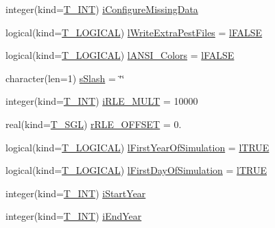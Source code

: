 \begin{DoxyCompactItemize}
\item 
integer(kind=\hyperlink{namespacetest_a6f91ebd89b58cfcc5da99faed9385c1e}{T\_\-INT}) \hyperlink{typetest_1_1_t___m_o_d_e_l___c_o_n_f_i_g_u_r_a_t_i_o_n_a2ba188b01d8c0f5653dc0f2c0a6d6722}{iConfigureMissingData}
\item 
logical(kind=\hyperlink{namespacetest_acdeac586276a7d1d394fb5eddc77fc3d}{T\_\-LOGICAL}) \hyperlink{typetest_1_1_t___m_o_d_e_l___c_o_n_f_i_g_u_r_a_t_i_o_n_a6b51e2f5c9172548b0d4ab207c83c366}{lWriteExtraPestFiles} = \hyperlink{namespacetest_ad44869e0204417021792170cd610ee25}{lFALSE}
\item 
logical(kind=\hyperlink{namespacetest_acdeac586276a7d1d394fb5eddc77fc3d}{T\_\-LOGICAL}) \hyperlink{typetest_1_1_t___m_o_d_e_l___c_o_n_f_i_g_u_r_a_t_i_o_n_a42c58ecbef54f15f365802f492c96925}{lANSI\_\-Colors} = \hyperlink{namespacetest_ad44869e0204417021792170cd610ee25}{lFALSE}
\item 
character(len=1) \hyperlink{typetest_1_1_t___m_o_d_e_l___c_o_n_f_i_g_u_r_a_t_i_o_n_a189e8cdf84807cb1cd85d11f7c542c34}{sSlash} = \char`\"{}\char`\"{}
\item 
integer(kind=\hyperlink{namespacetest_a6f91ebd89b58cfcc5da99faed9385c1e}{T\_\-INT}) \hyperlink{typetest_1_1_t___m_o_d_e_l___c_o_n_f_i_g_u_r_a_t_i_o_n_a4a9f607f0c91f345915f6bc9cdf683ad}{iRLE\_\-MULT} = 10000
\item 
real(kind=\hyperlink{namespacetest_a04d8b9090502de3a00046fe904bc3d99}{T\_\-SGL}) \hyperlink{typetest_1_1_t___m_o_d_e_l___c_o_n_f_i_g_u_r_a_t_i_o_n_ac5a30fe2f8e468f1e65ec6f9f4b89412}{rRLE\_\-OFFSET} = 0.
\item 
logical(kind=\hyperlink{namespacetest_acdeac586276a7d1d394fb5eddc77fc3d}{T\_\-LOGICAL}) \hyperlink{typetest_1_1_t___m_o_d_e_l___c_o_n_f_i_g_u_r_a_t_i_o_n_ae0fba627f5d035d5d2dfe130ee0760d0}{lFirstYearOfSimulation} = \hyperlink{namespacetest_ab7046de13f01778d86667e4266521664}{lTRUE}
\item 
logical(kind=\hyperlink{namespacetest_acdeac586276a7d1d394fb5eddc77fc3d}{T\_\-LOGICAL}) \hyperlink{typetest_1_1_t___m_o_d_e_l___c_o_n_f_i_g_u_r_a_t_i_o_n_a4b244573439e2dc59e930a1c33a1b087}{lFirstDayOfSimulation} = \hyperlink{namespacetest_ab7046de13f01778d86667e4266521664}{lTRUE}
\item 
integer(kind=\hyperlink{namespacetest_a6f91ebd89b58cfcc5da99faed9385c1e}{T\_\-INT}) \hyperlink{typetest_1_1_t___m_o_d_e_l___c_o_n_f_i_g_u_r_a_t_i_o_n_a52c7659bfa176f2f64f45651c41519c9}{iStartYear}
\item 
integer(kind=\hyperlink{namespacetest_a6f91ebd89b58cfcc5da99faed9385c1e}{T\_\-INT}) \hyperlink{typetest_1_1_t___m_o_d_e_l___c_o_n_f_i_g_u_r_a_t_i_o_n_a15a227ddde1a80d2e93593de03689fcd}{iEndYear}

\end{DoxyCompactItemize}
